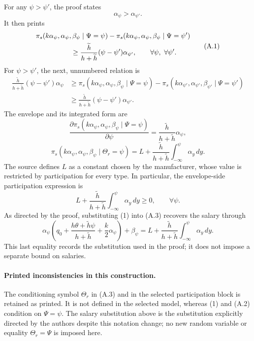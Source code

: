 \documentclass{article}
\begin{document}
For any \(\psi>\psi'\), the proof states
\[
\alpha_\psi>\alpha_{\psi'}.
\]
It then prints
\begin{equation}
\begin{aligned}
&\pi_s(k\alpha_\psi,\alpha_\psi,\beta_\psi\mid\Psi=\psi)
-\pi_s(k\alpha_\psi,\alpha_\psi,\beta_\psi\mid\Psi=\psi')\\
&\hspace{18mm}\geq
\frac{\widetilde h}{h+\widetilde h}(\psi-\psi')\alpha_{\psi'},
\qquad\forall\psi,\ \forall\psi'.
\end{aligned}
\tag{A.1}
\end{equation}
For \(\psi>\psi'\), the next, unnumbered relation is
\[
\begin{aligned}
\frac{\widetilde h}{h+\widetilde h}(\psi-\psi')\alpha_\psi
&\geq
\pi_s(k\alpha_\psi,\alpha_\psi,\beta_\psi\mid\Psi=\psi)
-\pi_s(k\alpha_{\psi'},\alpha_{\psi'},\beta_{\psi'}\mid\Psi=\psi')\\
&\geq
\frac{\widetilde h}{h+\widetilde h}(\psi-\psi')\alpha_{\psi'}.
\end{aligned}
\]
The envelope and its integrated form are
\begin{equation}
\frac{\partial\pi_s(k\alpha_\psi,\alpha_\psi,\beta_\psi\mid\Psi=\psi)}{\partial\psi}
=\frac{\widetilde h}{h+\widetilde h}\alpha_\psi,
\tag{A.2}
\end{equation}
\begin{equation}
\pi_s(k\alpha_\psi,\alpha_\psi,\beta_\psi\mid\Theta_r=\psi)
=L+\frac{\widetilde h}{h+\widetilde h}\int_{-\infty}^{\psi}\alpha_y\,dy.
\tag{A.3}
\end{equation}
The source defines \(L\) as a constant chosen by the manufacturer, whose value is restricted by participation for every type. In particular, the envelope-side participation expression is
\[
L+\frac{\widetilde h}{h+\widetilde h}\int_{-\infty}^{\psi}\alpha_y\,dy\geq0,
\qquad\forall\psi.
\]
As directed by the proof, substituting (1) into (A.3) recovers the salary through
\[
\alpha_\psi\left(q_0+\frac{h\theta+\widetilde h\psi}{h+\widetilde h}
+\frac{k}{2}\alpha_\psi\right)+\beta_\psi
=L+\frac{\widetilde h}{h+\widetilde h}\int_{-\infty}^{\psi}\alpha_y\,dy.
\]
This last equality records the substitution used in the proof; it does not impose a separate bound on salaries.

\paragraph{Printed inconsistencies in this construction.}
The conditioning symbol \(\Theta_r\) in (A.3) and in the selected participation block is retained as printed. It is not defined in the selected model, whereas (1) and (A.2) condition on \(\Psi=\psi\). The salary substitution above is the substitution explicitly directed by the authors despite this notation change; no new random variable or equality \(\Theta_r=\Psi\) is imposed here.
\end{document}
